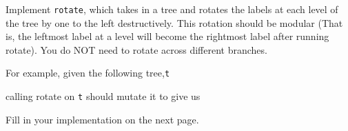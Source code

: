 \begin{blocksection}
\question Implement \texttt{rotate}, which takes in a tree and rotates the labels at each level of the tree by one to the left destructively. This rotation should be modular (That is, the leftmost label at a level will become the rightmost label after running rotate). You do NOT need to rotate across different branches.

For example, given the following tree,\texttt{t}


calling rotate on \texttt{t} should mutate it to give us 


Fill in your implementation on the next page.
\end{blocksection}

